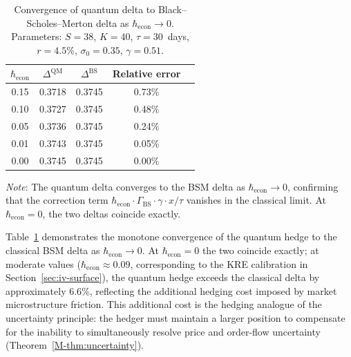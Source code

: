 \begin{table}[htbp]
\centering
\caption{Convergence of quantum delta to Black--Scholes--Merton delta as
$\hbar_{\mathrm{econ}} \to 0$. Parameters: $S = 38$, $K = 40$,
$\tau = 30$~days, $r = 4.5\%$, $\sigma_0 = 0.35$, $\gamma = 0.51$.}
\label{tab:delta-convergence}
\small
\begin{tabular}{ccccc}
\toprule
$\hbar_{\mathrm{econ}}$ & $\Delta^{\mathrm{QM}}$ & $\Delta^{\mathrm{BS}}$ &
  Relative error \\
\midrule
0.15 & 0.3718 & 0.3745 & 0.73\% \\
0.10 & 0.3727 & 0.3745 & 0.48\% \\
0.05 & 0.3736 & 0.3745 & 0.24\% \\
0.01 & 0.3743 & 0.3745 & 0.05\% \\
0.00 & 0.3745 & 0.3745 & 0.00\% \\
\bottomrule
\end{tabular}
\par\smallskip\noindent\footnotesize
\textit{Note}: The quantum delta converges to the BSM delta as
$\hbar_{\mathrm{econ}} \to 0$, confirming that the correction term
$\hbar_{\mathrm{econ}} \cdot \Gamma_{\mathrm{BS}} \cdot \gamma \cdot x/\tau$
vanishes in the classical limit. At $\hbar_{\mathrm{econ}} = 0$, the two
deltas coincide exactly.
\end{table}

Table~\ref{tab:delta-convergence} demonstrates the monotone convergence of the
quantum hedge to the classical BSM delta as $\hbar_{\mathrm{econ}} \to 0$. At
$\hbar_{\mathrm{econ}} = 0$ the two coincide exactly; at moderate values
($\hbar_{\mathrm{econ}} \approx 0.09$, corresponding to the KRE calibration in
Section~\ref{sec:iv-surface}), the quantum hedge exceeds the classical delta by
approximately $6.6\%$, reflecting the additional hedging cost imposed by
market microstructure friction. This additional cost is the hedging analogue of
the uncertainty principle: the hedger must maintain a larger position to
compensate for the inability to simultaneously resolve price and order-flow
uncertainty (Theorem~\ref{M-thm:uncertainty}).
